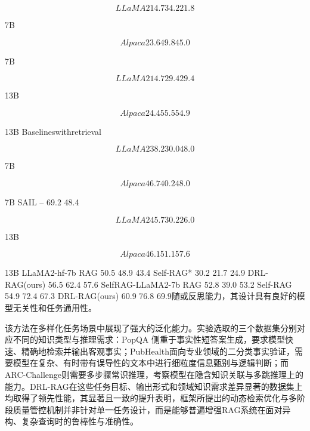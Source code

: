 \documentclass[12pt,a4paper,openright,UTF8]{ctexbook}
\begin{document}
\begin{equation}
LLaMA2 14.7 34.2 21.8
\end{equation}

7B

\begin{equation}
Alpaca 23.6 49.8 45.0
\end{equation}

7B

\begin{equation}
LLaMA2 14.7 29.4 29.4
\end{equation}

13B

\begin{equation}
Alpaca 24.4 55.5 54.9
\end{equation}

13B Baselineswithretrieval

\begin{equation}
LLaMA2 38.2 30.0 48.0
\end{equation}

7B

\begin{equation}
Alpaca 46.7 40.2 48.0
\end{equation}

7B SAIL – 69.2 48.4

\begin{equation}
LLaMA2 45.7 30.2 26.0
\end{equation}

13B

\begin{equation}
Alpaca 46.1 51.1 57.6
\end{equation}

13B LLaMA2-hf-7b RAG 50.5 48.9 43.4 Self-RAG* 30.2 21.7 24.9 DRL-RAG(ours) 56.5 62.4 57.6 SelfRAG-LLaMA2-7b RAG 52.8 39.0 53.2 Self-RAG 54.9 72.4 67.3 DRL-RAG(ours) 60.9 76.8 69.9随或反思能力，其设计具有良好的模型无关性和任务通用性。


该方法在多样化任务场景中展现了强大的泛化能力。实验选取的三个数据集分别对应不同的知识类型与推理需求：PopQA 侧重于事实性短答案生成，要求模型快速、精确地检索并输出客观事实；PubHealth面向专业领域的二分类事实验证，需要模型在复杂、有时带有误导性的文本中进行细粒度信息甄别与逻辑判断；而ARC-Challenge则需要多步骤常识推理，考察模型在隐含知识关联与多跳推理上的能力。DRL-RAG在这些任务目标、输出形式和领域知识需求差异显著的数据集上均取得了领先性能，其显著且一致的提升表明，框架所提出的动态检索优化与多阶段质量管控机制并非针对单一任务设计，而是能够普遍增强RAG系统在面对异构、复杂查询时的鲁棒性与准确性。
\end{document}
